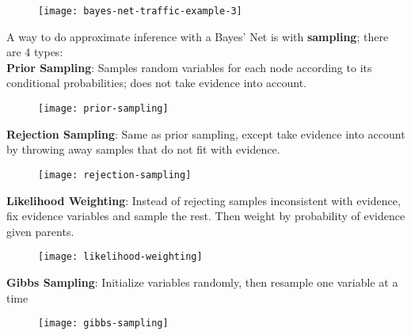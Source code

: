 \begin{figure}[H]
\centering
\texttt{[image: bayes-net-traffic-example-3]}
\end{figure}
A way to do approximate inference with a Bayes' Net is with \textbf{sampling}; there are 4 types: \\
\textbf{Prior Sampling}: Samples random variables for each node according to its conditional probabilities; does not take evidence into account.
\begin{figure}[H]
\centering
\texttt{[image: prior-sampling]}
\end{figure}
\textbf{Rejection Sampling}: Same as prior sampling, except take evidence into account by throwing away samples that do not fit with evidence.
\begin{figure}[H]
\centering
\texttt{[image: rejection-sampling]}
\end{figure}
\textbf{Likelihood Weighting}: Instead of rejecting samples inconsistent with evidence, fix evidence variables and sample the rest. Then weight by probability of evidence given parents.
\begin{figure}[H]
\centering
\texttt{[image: likelihood-weighting]}
\end{figure}
\textbf{Gibbs Sampling}: Initialize variables randomly, then resample one variable at a time
\begin{figure}[H]
\centering
\texttt{[image: gibbs-sampling]}
\end{figure}